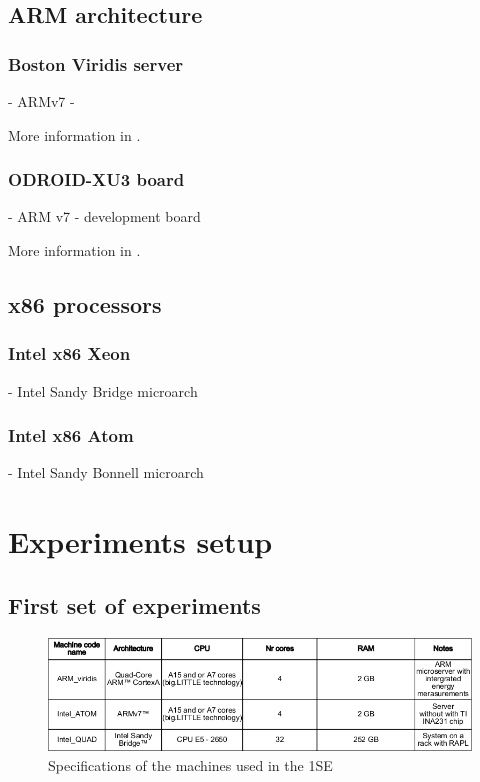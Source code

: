 \subsection{ARM architecture}
\subsubsection{Boston Viridis server}
- ARMv7
- 

More information in \cite{VIRIDIS}.

\subsubsection{ODROID-XU3 board}
- ARM v7
- development board

More information in \cite{ODROID_XU3}.

\subsection{x86 processors}
\subsubsection{Intel x86 Xeon}
- Intel Sandy Bridge microarch

\subsubsection{Intel x86 Atom}
- Intel Sandy Bonnell microarch


\section{Experiments setup}
\subsection{First set of experiments}

\begin{figure}[h!]
  \centering
    \includegraphics[width=150mm]{"img/1se_specs"}
    \caption{Specifications of the machines used in the 1SE}
    \label{fig:1se_specs}
\end{figure}


